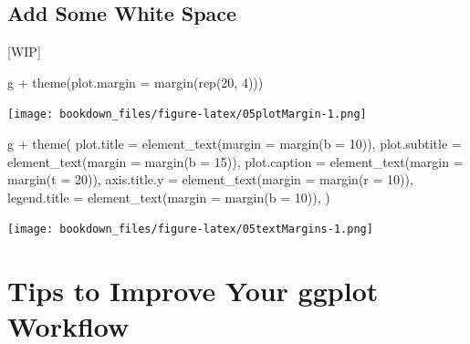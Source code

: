 \documentclass[
]{krantz}
\makeatletter
\newenvironment{Shaded}{\begin{snugshade}}{\end{snugshade}}
\newcommand{\AttributeTok}[1]{\textcolor[rgb]{0.61,0.61,0.61}{#1}}
\newcommand{\DecValTok}[1]{\textcolor[rgb]{0.06,0.06,0.06}{#1}}
\newcommand{\FunctionTok}[1]{\textcolor[rgb]{0,0,0}{#1}}
\newcommand{\NormalTok}[1]{#1}
\newcommand{\SpecialCharTok}[1]{\textcolor[rgb]{0,0,0}{#1}}
\newenvironment{kframe}{%
\medskip{}
\setlength{\fboxsep}{.8em}
 \def\at@end@of@kframe{}%
 \ifinner\ifhmode%
  \def\at@end@of@kframe{\end{minipage}}%
  \begin{minipage}{\columnwidth}%
 \fi\fi%
 \def\FrameCommand##1{\hskip\@totalleftmargin \hskip-\fboxsep
 \colorbox{shadecolor}{##1}\hskip-\fboxsep
     \hskip-\linewidth \hskip-\@totalleftmargin \hskip\columnwidth}%
 \MakeFramed {\advance\hsize-\width
   \@totalleftmargin\z@ \linewidth\hsize
   \@setminipage}}%
 {\par\unskip\endMakeFramed%
 \at@end@of@kframe}
\renewenvironment{Shaded}{\begin{kframe}}{\end{kframe}}
\makeatother
\begin{document}
\hypertarget{add-some-white-space}{%
\section{Add Some White Space}\label{add-some-white-space}}

{[}WIP{]}

\begin{Shaded}
\begin{Highlighting}[]
\NormalTok{g }\SpecialCharTok{+} \FunctionTok{theme}\NormalTok{(}\AttributeTok{plot.margin =} \FunctionTok{margin}\NormalTok{(}\FunctionTok{rep}\NormalTok{(}\DecValTok{20}\NormalTok{, }\DecValTok{4}\NormalTok{)))}
\end{Highlighting}
\end{Shaded}

\texttt{[image: bookdown\_files/figure-latex/05plotMargin-1.png]}

\begin{Shaded}
\begin{Highlighting}[]
\NormalTok{g }\SpecialCharTok{+} \FunctionTok{theme}\NormalTok{(}
  \AttributeTok{plot.title =} \FunctionTok{element\_text}\NormalTok{(}\AttributeTok{margin =} \FunctionTok{margin}\NormalTok{(}\AttributeTok{b =} \DecValTok{10}\NormalTok{)),}
  \AttributeTok{plot.subtitle =} \FunctionTok{element\_text}\NormalTok{(}\AttributeTok{margin =} \FunctionTok{margin}\NormalTok{(}\AttributeTok{b =} \DecValTok{15}\NormalTok{)),}
  \AttributeTok{plot.caption =} \FunctionTok{element\_text}\NormalTok{(}\AttributeTok{margin =} \FunctionTok{margin}\NormalTok{(}\AttributeTok{t =} \DecValTok{20}\NormalTok{)),}
  \AttributeTok{axis.title.y =} \FunctionTok{element\_text}\NormalTok{(}\AttributeTok{margin =} \FunctionTok{margin}\NormalTok{(}\AttributeTok{r =} \DecValTok{10}\NormalTok{)),}
  \AttributeTok{legend.title =} \FunctionTok{element\_text}\NormalTok{(}\AttributeTok{margin =} \FunctionTok{margin}\NormalTok{(}\AttributeTok{b =} \DecValTok{10}\NormalTok{)),}
\NormalTok{)}
\end{Highlighting}
\end{Shaded}

\texttt{[image: bookdown\_files/figure-latex/05textMargins-1.png]}

\hypertarget{tips-to-improve-your-ggplot-workflow}{%
\chapter{Tips to Improve Your ggplot Workflow}\label{tips-to-improve-your-ggplot-workflow}}
\end{document}
